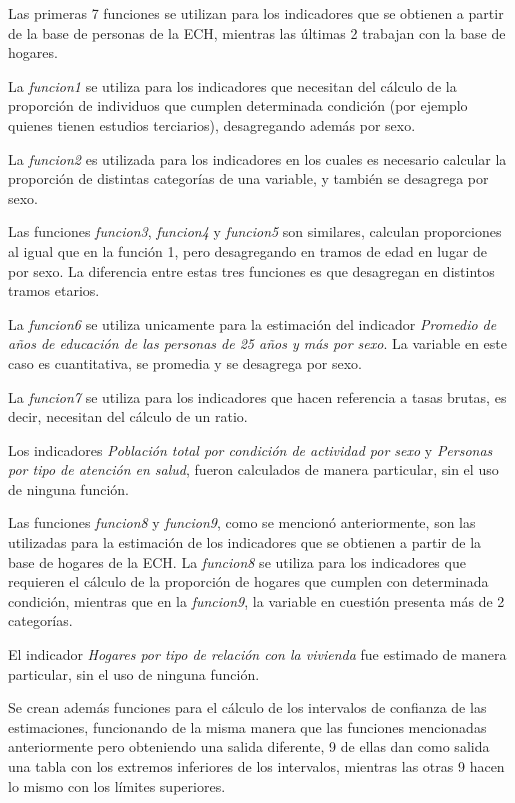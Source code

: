 \documentclass[12pt,twoside,spanish,a4paper]{book}\usepackage[]{graphicx}\usepackage[]{color}
\begin{document}
Las primeras 7 funciones se utilizan para los indicadores que se obtienen a partir de la base de personas de la ECH, mientras las últimas 2 trabajan con la base de hogares.

La \emph{funcion1} se utiliza para los indicadores que necesitan del cálculo de la proporción de individuos que cumplen determinada condición (por ejemplo quienes tienen estudios terciarios), desagregando además por sexo. 

La \emph{funcion2} es utilizada para los indicadores en los cuales es necesario calcular la proporción de distintas categorías de una variable, y también se desagrega por sexo. 

Las funciones \emph{funcion3}, \emph{funcion4} y \emph{funcion5} son similares, calculan proporciones al igual que en la función 1, pero desagregando en tramos de edad en lugar de por sexo. La diferencia entre estas tres funciones es que desagregan en distintos tramos etarios.

La \emph{funcion6} se utiliza unicamente para la estimación del indicador \textit{Promedio de años de educación de las personas de 25 años y más por sexo}. La variable en este caso es cuantitativa, se promedia y se desagrega por sexo.

La \emph{funcion7} se utiliza para los indicadores que hacen referencia a tasas brutas, es decir, necesitan del cálculo de un ratio.

Los indicadores \textit{Población total por condición de actividad por sexo} y \textit{Personas por tipo de atención en salud}, fueron calculados de manera particular, sin el uso de ninguna función.

Las funciones \emph{funcion8} y \emph{funcion9}, como se mencionó anteriormente, son las utilizadas para la estimación de los indicadores que se obtienen a partir de la base de hogares de la ECH. La \emph{funcion8} se utiliza para los indicadores que requieren el cálculo de la proporción de hogares que cumplen con determinada condición, mientras que en la \emph{funcion9}, la variable en cuestión presenta más de 2 categorías.

El indicador \textit{Hogares por tipo de relación con la vivienda} fue estimado de manera particular, sin el uso de ninguna función.

Se crean además funciones para el cálculo de los intervalos de confianza de las estimaciones, funcionando de la misma manera que las funciones mencionadas anteriormente pero obteniendo una salida diferente, 9 de ellas dan como salida una tabla con los extremos inferiores de los intervalos, mientras las otras 9 hacen lo mismo con los límites superiores.
\end{document}
